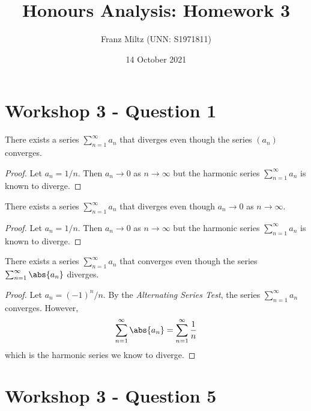 \documentclass{article}
\begin{document}
\title{Honours Analysis: Homework 3}
\author{Franz Miltz (UNN: S1971811)}
\date{14 October 2021}
\maketitle

\section{Workshop 3 - Question 1}

\begin{claim}
   There exists a series $\sum_{n=1}^\infty a_n$ that diverges even though the
   series $(a_n)$ converges.
\end{claim}
\begin{proof}
   Let $a_n=1/n$. Then $a_n\to 0$ as $n\to\infty$ but the harmonic series
   $\sum_{n=1}^\infty a_n$ is known to diverge.
\end{proof}

\begin{claim}
   There exists a series $\sum_{n=1}^\infty a_n$ that diverges even though
   $a_n\to 0$ as $n\to\infty$.
\end{claim}
\begin{proof}
   Let $a_n=1/n$. Then $a_n\to 0$ as $n\to\infty$ but the harmonic series
   $\sum_{n=1}^\infty a_n$ is known to diverge.
\end{proof}

\begin{claim}
   There exists a series $\sum_{n=1}^\infty a_n$ that converges even though
   the series $\sum_{n=1}^\infty \abs{a_n}$ diverges.
\end{claim}
\begin{proof}
   Let $a_n=(-1)^n/n$. By the \emph{Alternating Series Test}, the series $\sum_{n=1}^\infty a_n$
   converges. However,
   \begin{align}
      \sum_{n=1}^\infty \abs{a_n} = \sum_{n=1}^\infty \frac{1}{n}
   \end{align}
   which is the harmonic series we know to diverge.
\end{proof}

\section{Workshop 3 - Question 5}
\end{document}
